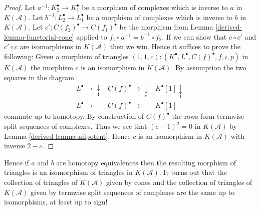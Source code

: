 \begin{proof}

Let $a^{-1} : K_2^\bullet \to K_1^\bullet$ be a morphism of complexes which
is inverse to $a$ in $K(\mathcal{A})$.
Let $b^{-1} : L_2^\bullet \to L_1^\bullet$ be a morphism of complexes which
is inverse to $b$ in $K(\mathcal{A})$.
Let $c' : C(f_2)^\bullet \to C(f_1)^\bullet$
be the morphism from Lemma \ref{derived-lemma-functorial-cone} applied
to $f_1 \circ a^{-1} = b^{-1} \circ f_2$. If we can show that
$c \circ c'$ and $c' \circ c$ are isomorphisms in $K(\mathcal{A})$
then we win. Hence it suffices to prove the following: Given
a morphism of triangles
$(1, 1, c) : (K^\bullet, L^\bullet, C(f)^\bullet, f, i, p)$
in $K(\mathcal{A})$ the morphism $c$ is an isomorphism in $K(\mathcal{A})$.
By assumption the two squares in the diagram
$$
\begin{array}{ccc}L^\bullet \longrightarrow\underset{1}{\downarrow} & C(f)^\bullet \longrightarrow\underset{c}{\downarrow} & K^\bullet[1] \underset{1}{\downarrow} \\ L^\bullet \longrightarrow & C(f)^\bullet \longrightarrow & K^\bullet[1]\end{array}
$$
commute up to homotopy. By construction of $C(f)^\bullet$ the rows
form termwise split sequences of complexes. Thus we see that
$(c - 1)^2 = 0$ in $K(\mathcal{A})$ by Lemma \ref{derived-lemma-nilpotent}.
Hence $c$ is an isomorphism in $K(\mathcal{A})$ with inverse $2 - c$.
\end{proof}

Hence if $a$ and $b$ are homotopy equivalences then
the resulting morphism of triangles is an isomorphism of triangles
in $K(\mathcal{A})$.
It turns out that the collection of triangles of $K(\mathcal{A})$
given by cones and the collection of triangles of $K(\mathcal{A})$
given by termwise split sequences of complexes are the same
up to isomorphisms, at least up to sign!

